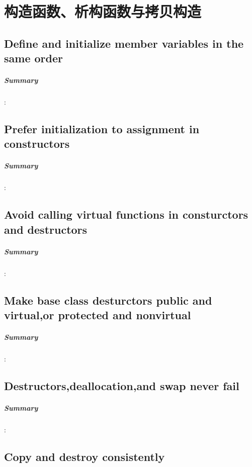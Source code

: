 \documentclass[UTF8,a4paper,12pt]{ctexbook}
\begin{document}
\chapter{构造函数、析构函数与拷贝构造}
	\section{Define and initialize member variables in the same order}
		\paragraph{Summary}:
		
		
	\section{Prefer initialization to assignment in constructors}
		\paragraph{Summary}:
		
		
	\section{Avoid calling virtual functions in consturctors and destructors}
		\paragraph{Summary}:
		
		
	\section{Make base class desturctors public and virtual,or protected and nonvirtual}
		\paragraph{Summary}:
	
	
	\section{Destructors,deallocation,and swap never fail}
		\paragraph{Summary}:
		
		
	\section{Copy and destroy consistently}
\end{document}
